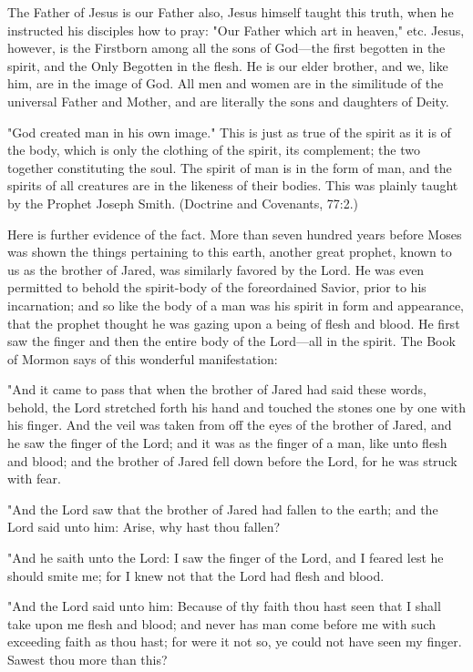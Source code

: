 The Father of Jesus is our Father also, Jesus himself taught this truth, when he instructed his
disciples how to pray: "Our Father which art in heaven," etc. Jesus, however, is the Firstborn
among all the sons of God—the first begotten in the spirit, and the Only Begotten in the
flesh. He is our elder brother, and we, like him, are in the image of God. All men and women
are in the similitude of the universal Father and Mother, and are literally the sons and
daughters of Deity.

"God created man in his own image." This is just as true of the spirit as it is of the body,
which is only the clothing of the spirit, its complement; the two together constituting the
soul. The spirit of man is in the form of man, and the spirits of all creatures are in the likeness
of their bodies. This was plainly taught by the Prophet Joseph Smith. (Doctrine and
Covenants, 77:2.)

Here is further evidence of the fact. More than seven hundred years before Moses was shown
the things pertaining to this earth, another great prophet, known to us as the brother of Jared,
was similarly favored by the Lord. He was even permitted to behold the spirit-body of the
foreordained Savior, prior to his incarnation; and so like the body of a man was his spirit in
form and appearance, that the prophet thought he was gazing upon a being of flesh and
blood. He first saw the finger and then the entire body of the Lord—all in the spirit. The
Book of Mormon says of this wonderful manifestation:

"And it came to pass that when the brother of Jared had said these words, behold, the Lord
stretched forth his hand and touched the stones one by one with his finger. And the veil was
taken from off the eyes of the brother of Jared, and he saw the finger of the Lord; and it was
as the finger of a man, like unto flesh and blood; and the brother of Jared fell down before the
Lord, for he was struck with fear.

"And the Lord saw that the brother of Jared had fallen to the earth; and the Lord said unto
him: Arise, why hast thou fallen?

"And he saith unto the Lord: I saw the finger of the Lord, and I feared lest he should smite
me; for I knew not that the Lord had flesh and blood.

"And the Lord said unto him: Because of thy faith thou hast seen that I shall take upon me
flesh and blood; and never has man come before me with such exceeding faith as thou hast;
for were it not so, ye could not have seen my finger. Sawest thou more than this?

